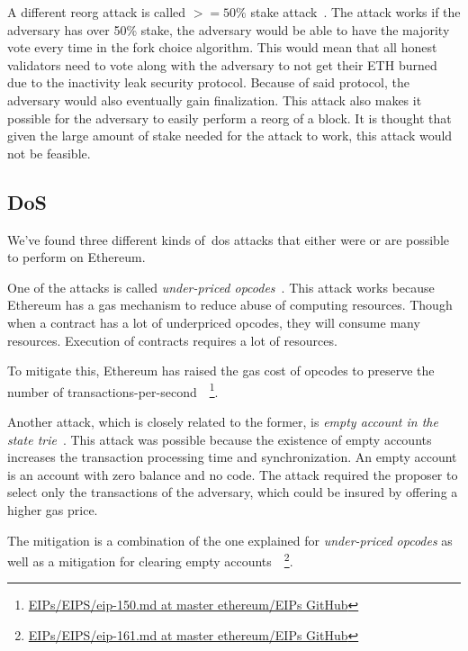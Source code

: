 A different reorg attack is called $>=50\%$ stake attack~\cite{EthereumAttackDefense2024}.
The attack works if the adversary has over 50\% stake, the adversary would be able to have the majority vote every time in the fork choice algorithm.
This would mean that all honest validators need to vote along with the adversary to not get their ETH burned due to the inactivity leak security protocol.
Because of said protocol, the adversary would also eventually gain finalization.
This attack also makes it possible for the adversary to easily perform a reorg of a block.
It is thought that given the large amount of stake needed for the attack to work, this attack would not be feasible.



\subsection{DoS}\label{subsec:dos}
We've found three different kinds of~\gls{dos} attacks that either were or are possible to perform on Ethereum.

One of the attacks is called \textit{under-priced opcodes}~\cite{10.1145/3391195,9815256}.
This attack works because Ethereum has a gas mechanism to reduce abuse of computing resources.
Though when a contract has a lot of underpriced opcodes, they will consume many resources.
Execution of contracts requires a lot of resources.

To mitigate this,
Ethereum has raised the gas cost of opcodes
to preserve the number of transactions-per-second~\cite{Opcode-mitigation}~\footnote{
\href{https://github.com/ethereum/EIPs/blob/master/EIPS/eip-150.md}{EIPs/EIPS/eip-150.md at master ethereum/EIPs GitHub}}.

Another attack,
which is closely related to the former, is \textit{empty account in the state trie}~\cite{10.1145/3391195,9815256}.
This attack was possible
because the existence of empty accounts increases the transaction processing time and synchronization.
An empty account is an account with zero balance and no code.
The attack required the proposer to select only the transactions of the adversary,
which could be insured by offering a higher gas price.

The mitigation is a combination of the one
explained for \textit{under-priced opcodes} as well as a mitigation
for clearing empty accounts~\cite{Opcode-mitigation,empty-account-mitigation,empty-account-eip-mitigation}~\footnote{
\href{https://github.com/ethereum/EIPs/blob/master/EIPS/eip-161.md}{EIPs/EIPS/eip-161.md at master ethereum/EIPs GitHub}}.

